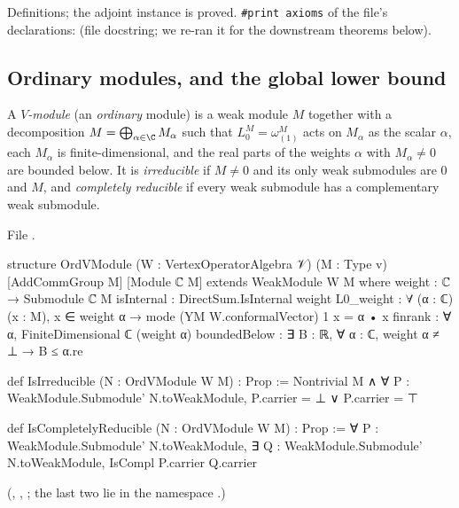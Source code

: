 \begin{status}
Definitions; the adjoint instance is proved. \texttt{\#print axioms} of the file's declarations:
 (file docstring; we re-ran it for the downstream
theorems below).
\end{status}

\subsection{Ordinary modules, and the global lower bound}

\begin{definition}\label{l12:def:ordmodule}
A \emph{$V$-module} (an \emph{ordinary} module) is a weak module $M$ together with a decomposition
$M = \bigoplus_{\alpha\in\C}M_\alpha$ such that $L^M_0 = \omega^M_{(1)}$ acts on $M_\alpha$ as the scalar $\alpha$, each
$M_\alpha$ is finite-dimensional, and the real parts of the weights $\alpha$ with $M_\alpha\neq0$ are bounded below. It is
\emph{irreducible} if $M\neq0$ and its only weak submodules are $0$ and $M$, and \emph{completely reducible} if every weak
submodule has a complementary weak submodule.
\end{definition}
\noindent File .
\begin{leancode}
structure OrdVModule (W : VertexOperatorAlgebra 𝒱) (M : Type v)
    [AddCommGroup M] [Module ℂ M] extends WeakModule W M where
  weight : ℂ → Submodule ℂ M
  isInternal : DirectSum.IsInternal weight
  L0_weight : ∀ (α : ℂ) (x : M), x ∈ weight α → mode (YM W.conformalVector) 1 x = α • x
  finrank : ∀ α, FiniteDimensional ℂ (weight α)
  boundedBelow : ∃ B : ℝ, ∀ α : ℂ, weight α ≠ ⊥ → B ≤ α.re

def IsIrreducible (N : OrdVModule W M) : Prop :=
  Nontrivial M ∧ ∀ P : WeakModule.Submodule' N.toWeakModule, P.carrier = ⊥ ∨ P.carrier = ⊤

def IsCompletelyReducible (N : OrdVModule W M) : Prop :=
  ∀ P : WeakModule.Submodule' N.toWeakModule,
    ∃ Q : WeakModule.Submodule' N.toWeakModule, IsCompl P.carrier Q.carrier
\end{leancode}
(, , ; the last two lie in
the namespace .)

